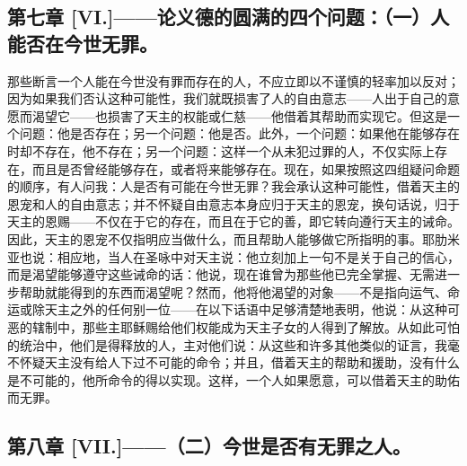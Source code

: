 
\subsection{第七章 [VI.]——论义德的圆满的四个问题：（一）人能否在今世无罪。}

那些断言一个人能在今世没有罪而存在的人，不应立即以不谨慎的轻率加以反对；因为如果我们否认这种可能性，我们就既损害了人的自由意志——人出于自己的意愿而渴望它——也损害了天主的权能或仁慈——他借着其帮助而实现它。但这是一个问题：他是否存在；另一个问题：他是否。此外，一个问题：如果他在能够存在时却不存在，他不存在；另一个问题：这样一个从未犯过罪的人，不仅实际上存在，而且是否曾经能够存在，或者将来能够存在。现在，如果按照这四组疑问命题的顺序，有人问我：人是否有可能在今世无罪？我会承认这种可能性，借着天主的恩宠和人的自由意志；并不怀疑自由意志本身应归于天主的恩宠，换句话说，归于天主的恩赐——不仅在于它的存在，而且在于它的善，即它转向遵行天主的诫命。因此，天主的恩宠不仅指明应当做什么，而且帮助人能够做它所指明的事。耶肋米亚也说：相应地，当人在圣咏中对天主说：他立刻加上一句不是关于自己的信心，而是渴望能够遵守这些诫命的话：他说，现在谁曾为那些他已完全掌握、无需进一步帮助就能得到的东西而渴望呢？然而，他将他渴望的对象——不是指向运气、命运或除天主之外的任何别一位——在以下话语中足够清楚地表明，他说：从这种可恶的辖制中，那些主耶稣赐给他们权能成为天主子女的人得到了解放。从如此可怕的统治中，他们是得释放的人，主对他们说：从这些和许多其他类似的证言，我毫不怀疑天主没有给人下过不可能的命令；并且，借着天主的帮助和援助，没有什么是不可能的，他所命令的得以实现。这样，一个人如果愿意，可以借着天主的助佑而无罪。\par


\subsection{第八章 [VII.]——（二）今世是否有无罪之人。}


